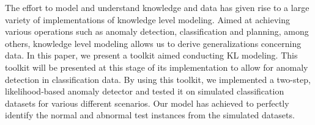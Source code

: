 The effort to model and understand knowledge and data has given rise to a large variety of implementations of knowledge level modeling. 
Aimed at achieving various operations such as anomaly detection, classification and planning, among others, knowledge level modeling allows us to derive generalizations concerning data. 
In this paper, we present a toolkit aimed conducting KL modeling. 
This toolkit will be presented at this stage of its implementation to allow for anomaly detection in classification data.
By using this toolkit, we implemented a two-step, likelihood-based anomaly detector and tested it on simulated classification datasets for various different scenarios.
Our model has achieved to perfectly identify the normal and abnormal test instances from the simulated datasets.
